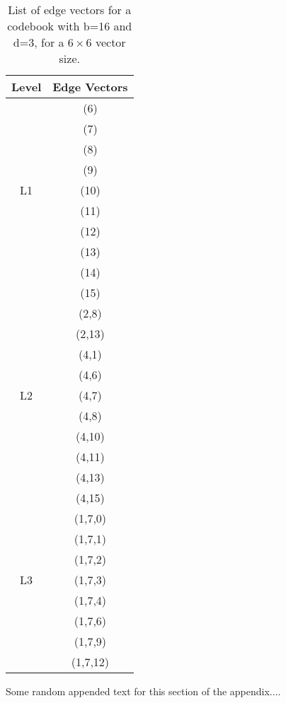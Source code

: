 \begin{table}[!t]
  \renewcommand{\arraystretch}{1.3}
  \centering

  \caption{ List of edge vectors for a codebook with b=16 and d=3, for
    a $6 \times 6$ vector size.}
  \label{table5}

  \begin{tabular}{|c|c|} \hline
    Level & Edge Vectors \\ \hline

    & (6)\\
    & (7)\\
    & (8)\\
    & (9)\\
    L1 & (10)\\
    & (11)\\
    & (12)\\
    & (13)\\
    & (14)\\
    & (15) \\ \hline

    & (2,8)\\
    & (2,13)\\
    & (4,1)\\
    & (4,6)\\
    L2 & (4,7)\\
    & (4,8)\\
    & (4,10)\\
    & (4,11)\\
    & (4,13)\\
    & (4,15) \\ \hline

    & (1,7,0)\\
    & (1,7,1)\\
    & (1,7,2)\\
    L3 & (1,7,3)\\
    & (1,7,4)\\
    & (1,7,6)\\
    & (1,7,9)\\
    & (1,7,12) \\ \hline

  \end{tabular}

\end{table}



\label{sec:back}


Some random appended text for this section of the appendix....


